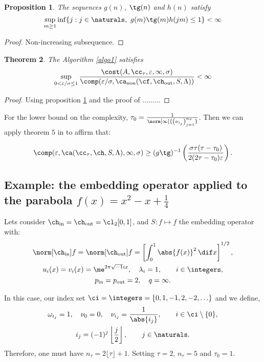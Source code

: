 \documentclass[final]{elsarticle}
\newcommand{\chin}{\ch_{\text{\rm{in}}}}
\newcommand{\chout}{\ch_{\text{\rm{out}}}}
\newcommand{\pin}{p_{\text{\rm{in}}}}
\newcommand{\pout}{p_{\text{\rm{out}}}}
\DeclareMathOperator{\non}{non}
\newtheorem{theorem}{Theorem}
\newtheorem{prop}[theorem]{Proposition}
\theoremstyle{definition}
\theoremstyle{remark}
\begin{document}
\begin{prop}\label{optalgoseq}
The sequences $g(n)$, $\tg(n)$ and $h(n)$ satisfy
\begin{equation*}
\sup_{m\ge 1} \inf\{j : j \in \naturals, \ g(m)\tg(m)h(jm) \le 1 \}  < \infty
\end{equation*}
\end{prop}
\begin{proof}
Non-increasing subsequence.
\end{proof}

\begin{theorem}
The Algorithm \ref{algo1} satisfies
\begin{equation*}
\sup_{0 < \varepsilon/\sigma \le 1}\frac{\cost(A,\cc_\tau,\varepsilon,\infty,\sigma)} {\comp(\varepsilon/\sigma,\ca_{\non}(\cf,\chout,S,\Lambda))} <\infty
\end{equation*}
\end{theorem}
\begin{proof}
Using proposition \ref{optalgoseq} and the proof of \cite{HicEtal14b}.........
\end{proof}

For the lower bound on the complexity, $\tau_0=\frac{1}{\norm[\infty]{\left(\nu_{i_j} \right)_{j=1}^{n_\tau}}}$. Then we can apply theorem $5$ in \cite{HicEtal14b} to affirm that:

\begin{equation*}
\comp(\varepsilon,\ca(\cc_{\tau},\ch,S,\Lambda),\infty,\sigma) \ge  (g\tg)^{-1}\left(\frac{\sigma\tau(\tau-\tau_0)}{2(2\tau-\tau_0)\varepsilon}\right).
\end{equation*}

\subsection{Example: the embedding operator applied to the parabola $f(x)=x^2-x+\frac{1}{4}$}

Lets consider $\chin=\chout=\cl_2[0,1]$, and $S: f \mapsto f$ the embedding operator with:
\begin{gather*}
\norm[\chin]{f} = \norm[\chout]{f} = \left[\int_0^1 \abs{f(x)}^2 \, \dif x \right]^{1/2}, \\
u_{i}(x) = v_i(x) = \me^{2 \pi \sqrt{-1} i x},\quad \lambda_i=1, \qquad i \in \integers,\\
\pin=\pout=2,\quad q=\infty.
\end{gather*}

In this case, our index set $\ci=\integers=\{0,1,-1,2,-2,\ldots\}$ and we define,
\begin{gather*}
\omega_{i_j} = 1,\quad \nu_{0}=0,\quad \nu_{i_j} = \frac{1}{\abs{i_j}}, \qquad i \in \ci\setminus\{0\},\\
i_j=(-1)^{j}\left\lfloor\frac{j}{2}\right\rfloor,\qquad j\in\naturals.
\end{gather*}
Therefore, one must have $n_\tau=2\lfloor\tau\rfloor+1$. Setting $\tau=2$, $n_\tau=5$ and $\tau_0=1$.
\end{document}

